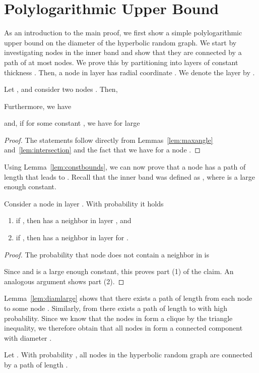 \documentclass{llncs}
\newcommand{\lemref}[1]{Lemma~\ref{lem:#1}}
\newcommand{\lemrefs}[2]{Lemmas~\ref{lem:#1} and~\ref{lem:#2}}
\begin{document}
\section{Polylogarithmic Upper Bound}
\label{sec:polyupper}
As an introduction to the main proof, we first show a simple polylogarithmic upper bound on the diameter of the hyperbolic random graph. We start by  investigating nodes in the inner band  and show that they are connected by a path of at most  nodes.  
We prove this by partitioning  into  layers of constant thickness . Then, a node in layer  has radial coordinate . We denote the layer  by .
\begin{lemma}
\label{lem:constbounds}
Let , and consider two nodes . Then,

Furthermore, we have

and, if  for some constant , we have for large 

\end{lemma}
\begin{proof}
The statements follow directly from \lemrefs{maxangle}{intersection} and the fact that we have  for a node .
\end{proof}
Using \lemref{constbounds}, we can now prove that a node  has a path of length  that leads to . Recall that the inner band was defined as , where  is a large enough constant.
\begin{lemma}
\label{lem:diamlarge}
Consider a node  in layer . With probability  it holds 
\begin{enumerate}
\item if , then  has a neighbor in layer , and
\item if , then  has a neighbor in layer  for .
\end{enumerate}
\end{lemma}
\begin{proof}
The probability that node  does not contain a neighbor in  is

Since  and  is a large enough constant, this proves part (1) of the claim. An analogous argument shows part (2).
\end{proof}
\lemref{diamlarge} shows that there exists a path of length  from each node   to some node . Similarly, from  there exists a path of length  to  with high probability. Since we know that the nodes in  form a clique by the triangle inequality, we therefore obtain that all nodes in  form a connected component with diameter .
\begin{corollary}
\label{cor:smalldiam}
Let . With probability , all nodes  in the hyperbolic random graph are connected by a path of length .
\end{corollary} 
\end{document}
